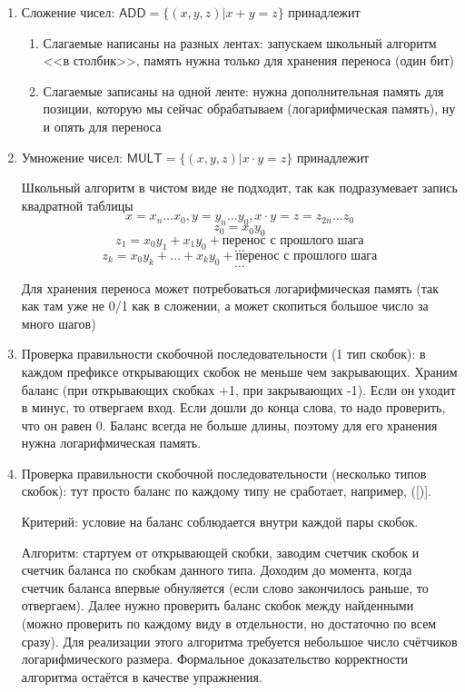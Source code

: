 \begin{enumerate}
    \item Сложение чисел: $\mathsf{ADD} = \{(x, y, z) | x + y = z\}$ принадлежит \lsp
    \begin{enumerate}
        \item Слагаемые написаны на разных лентах: запускаем школьный алгоритм <<в столбик>>, память нужна только для хранения переноса (один бит)
        \item Слагаемые записаны на одной ленте: нужна дополнительная память для позиции, которую мы сейчас обрабатываем (логарифмическая память), ну и опять для переноса
    \end{enumerate}

    \item Умножение чисел: $\mathsf{MULT} = \{(x, y, z) | x \cdot y = z\}$ принадлежит \lsp
    
    Школьный алгоритм в чистом виде не подходит, так как подразумевает запись квадратной таблицы
    \[ x=x_n\ldots x_0, y=y_n\ldots y_0, x\cdot y=z=z_{2n}\ldots z_0\]
    \[ z_0=x_0y_0 \]
    \[ z_1=x_0y_1+x_1y_0+\text{перенос с прошлого шага} \]
    \[\ldots\]
    \[ z_k=x_0y_k+\ldots+x_ky_0+\text{перенос с прошлого шага} \]
    \[\ldots\]

    Для хранения переноса может потребоваться логарифмическая память (так как там уже не 0/1 как в сложении, а может скопиться большое число за много шагов)

    \item Проверка правильности скобочной последовательности (1 тип скобок): в каждом префиксе открывающих скобок не меньше чем закрывающих. Храним баланс (при открывающих скобках +1, при закрывающих -1). Если он уходит в минус, то отвергаем вход. Если дошли до конца слова, то надо проверить, что он равен 0. Баланс всегда не больше длины, поэтому для его хранения нужна логарифмическая память.

    \item Проверка правильности скобочной последовательности (несколько типов скобок): тут просто баланс по каждому типу не сработает, например, ([)].

    Критерий: условие на баланс соблюдается внутри каждой пары скобок. 

    Алгоритм: стартуем от открывающей скобки, заводим счетчик скобок и счетчик баланса по скобкам данного типа. Доходим до момента, когда счетчик баланса впервые обнуляется (если слово закончилось раньше, то отвергаем). Далее нужно проверить баланс скобок между найденными (можно проверить по каждому виду в отдельности, но достаточно по всем сразу). Для реализации этого алгоритма требуется небольшое число счётчиков логарифмического размера. Формальное доказательство корректности алгоритма остаётся в качестве упражнения.
\end{enumerate}